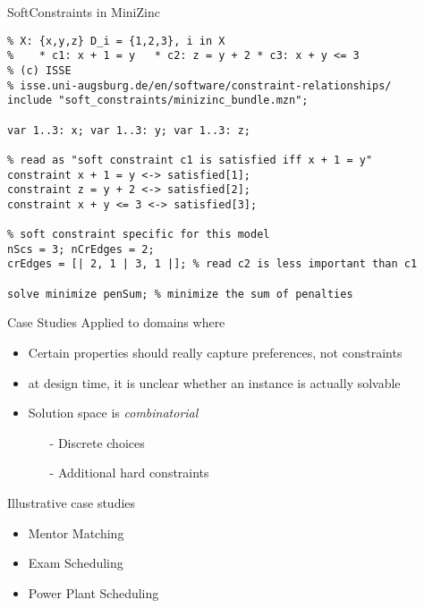\documentclass[10pt,xcolor={dvipsnames},fleqn]{beamer}
\begin{document}
\begin{frame}[fragile]{SoftConstraints in MiniZinc}
\begin{lstlisting}
% X: {x,y,z} D_i = {1,2,3}, i in X
%    * c1: x + 1 = y   * c2: z = y + 2 * c3: x + y <= 3
% (c) ISSE
% isse.uni-augsburg.de/en/software/constraint-relationships/
include "soft_constraints/minizinc_bundle.mzn";

var 1..3: x; var 1..3: y; var 1..3: z;

% read as "soft constraint c1 is satisfied iff x + 1 = y"
constraint x + 1 = y <-> satisfied[1];
constraint z = y + 2 <-> satisfied[2];
constraint x + y <= 3 <-> satisfied[3];

% soft constraint specific for this model
nScs = 3; nCrEdges = 2;
crEdges = [| 2, 1 | 3, 1 |]; % read c2 is less important than c1

solve minimize penSum; % minimize the sum of penalties
\end{lstlisting}

\end{frame}


\begin{frame}{Case Studies}
Applied to domains where 
\begin{itemize}
\item Certain properties should really capture \alert{preferences}, not constraints
\item at design time, it is \alert{unclear} whether an instance is actually solvable
\item Solution space is \emph{combinatorial}
\begin{itemize}
\item[-] Discrete choices
\item[-] Additional hard constraints
\end{itemize}
\end{itemize}

\vspace*{2ex}

Illustrative case studies 
\begin{itemize}
\item Mentor Matching
\item Exam Scheduling
\item Power Plant Scheduling
\end{itemize}
\end{frame}
\end{document}
